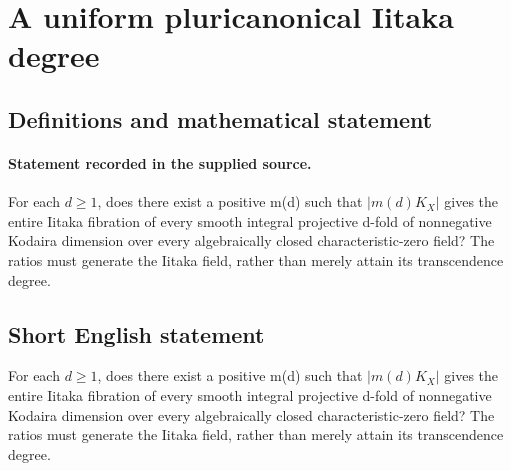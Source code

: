\documentclass[11pt]{article}
\begin{document}
\section*{A uniform pluricanonical Iitaka degree}\label{30007075}
\subsection{Definitions and mathematical statement}
\paragraph{Statement recorded in the supplied source.}
For each $d\geq 1$, does there exist a positive m(d) such that $|m(d)K_X|$ gives the entire Iitaka fibration of every smooth integral projective d-fold of nonnegative Kodaira dimension over every algebraically closed characteristic-zero field? The ratios must generate the Iitaka field, rather than merely attain its transcendence degree.
\subsection{Short English statement}
For each $d\geq 1$, does there exist a positive m(d) such that $|m(d)K_X|$ gives the entire Iitaka fibration of every smooth integral projective d-fold of nonnegative Kodaira dimension over every algebraically closed characteristic-zero field? The ratios must generate the Iitaka field, rather than merely attain its transcendence degree.
\end{document}
